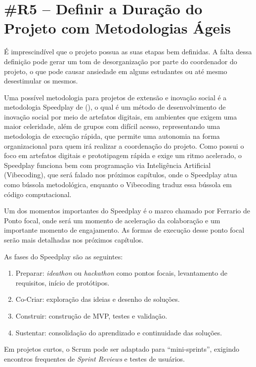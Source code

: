 \section*{\#R5 – Definir a Duração do Projeto com Metodologias Ágeis}

É imprescindível que o projeto possua as suas etapas bem definidas. A falta dessa definição pode gerar um tom de desorganização por parte do coordenador do projeto, o que pode causar ansiedade em alguns estudantes ou até mesmo desestimular os mesmos. 

Uma possível metodologia para projetos de extensão e inovação social é a metodologia Speedplay de \citeauthor{ferrario2014} (\citeyear{ferrario2014}), o qual é um método de desenvolvimento de inovação social por meio de artefatos digitais, em ambientes que exigem uma maior celeridade, além de grupos com difícil acesso, representando uma metodologia de execução rápida, que permite uma autonomia na forma organizacional para quem irá realizar a coordenação do projeto. Como possui o foco em artefatos digitais e prototipagem rápida e exige um ritmo acelerado, o Speedplay funciona bem com programação via Inteligência Artificial (Vibecoding), que será falado nos próximos capítulos, onde o Speedplay atua como bússola metodológica, enquanto o Vibecoding traduz essa bússola em código computacional. 

Um dos momentos importantes do Speedplay é o marco chamado por Ferrario de Ponto focal, onde será um momento de aceleração da colaboração e um importante momento de engajamento. As formas de execução desse ponto focal serão mais detalhadas nos próximos capítulos.

As fases do Speedplay são as seguintes:

\begin{enumerate}
    \item Preparar: \textit{ideathon} ou \textit{hackathon} como pontos focais, levantamento de requisitos, início de protótipos.
    \item Co-Criar: exploração das ideias e desenho de soluções.
    \item Construir: construção de MVP, testes e validação.
    \item Sustentar: consolidação do aprendizado e continuidade das soluções.
\end{enumerate}

Em projetos curtos, o Scrum pode ser adaptado para “mini-sprints”, exigindo encontros frequentes de \textit{Sprint Reviews} e testes de usuários.
